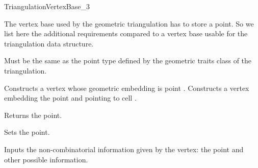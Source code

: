 

\begin{ccRefConcept}{TriangulationVertexBase_3}


\ccDefinition

The vertex base used by the geometric triangulation has to store a point.
So we list here the additional requirements compared to a vertex base usable
for the triangulation data structure.


\ccTypes
{}
{Must be the same as the point type 
defined by the geometric traits class of the triangulation.} 

\ccCreation
{}  %


{Constructs a vertex whose geometric embedding is point .} 
\ccGlue
{}
{Constructs a vertex embedding the point  and pointing to cell .}

\ccAccessFunctions
{}

{Returns the point.} 


{Sets the point.} 


{Inputs the non-combinatorial information given by the vertex: 
the point and other possible information.}


\end{ccRefConcept}
